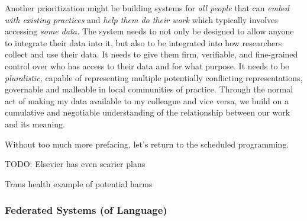 \documentclass[10pt]{article}
\begin{document}
\begin{multicols}{2}
Another prioritization might be building systems for \emph{all people}
that can \emph{embed with existing practices} and \emph{help them do
their work} which typically involves accessing \emph{some data.} The
system needs to not only be designed to allow anyone to integrate their
data into it, but also to be integrated into how researchers collect and
use their data. It needs to give them firm, verifiable, and fine-grained
control over who has access to their data and for what purpose. It needs
to be \emph{pluralistic,} capable of representing multiple potentially
conflicting representations, governable and malleable in local
communities of practice. Through the normal act of making my data
available to my colleague and vice versa, we build on a cumulative and
negotiable understanding of the relationship between our work and its
meaning.

Without too much more prefacing, let's return to the scheduled
programming.

TODO: Elsevier {has even scarier plans}

Trans health {example of potential harms}


\end{multicols}


\hypertarget{federated-systems-of-language}{%
\subsubsection{Federated Systems (of
Language)}\label{federated-systems-of-language}}
\end{document}
